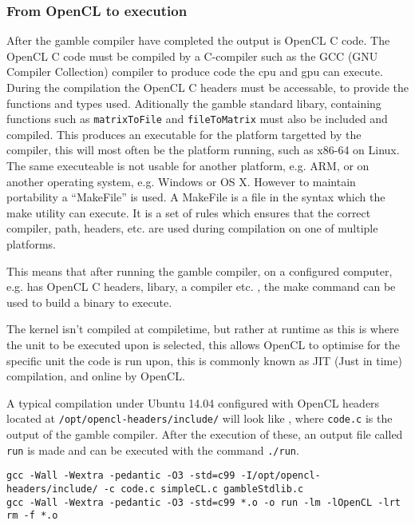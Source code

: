 \subsubsection*{From OpenCL to execution}
After the \gls{gamble} compiler have completed the output is OpenCL C code.
The OpenCL C code must be compiled by a C-compiler such as the GCC (GNU Compiler Collection) compiler to produce code the \acrshort{cpu} and \acrshort{gpu} can execute.
During the compilation the OpenCL C headers must be accessable, to provide the functions and types used. 
Aditionally the \gls{gamble} standard libary, containing functions such as \texttt{matrixToFile} and \texttt{fileToMatrix} must also be included and compiled. 
This produces an executable for the platform targetted by the compiler, this will most often be the platform running, such as x86-64 on Linux.
The same executeable is not usable for another platform, e.g. ARM, or on another operating system, e.g. Windows or OS X. 
However to maintain portability a ``MakeFile'' is used. 
A MakeFile is a file in the syntax which the make utility can execute. 
It is a set of rules which ensures that the correct compiler, path, headers, etc. are used during compilation on one of multiple platforms. 

This means that after running the \gls{gamble} compiler, on a configured computer, e.g. has OpenCL C headers, libary, a compiler etc. , the make command can be used to build a binary to execute.

The kernel isn't compiled at compiletime, but rather at runtime as this is where the unit to be executed upon is selected, this allows OpenCL to optimise for the specific unit the code is run upon, this is commonly known as JIT (Just in time) compilation, and online by OpenCL. \citep{openclbookjit}

A typical compilation under Ubuntu 14.04 configured with OpenCL headers located at \texttt{/opt/opencl-headers/include/} will look like , where \texttt{code.c} is the output of the \gls{gamble} compiler.
After the execution of these, an output file called \texttt{run} is made and can be executed with the command \texttt{./run}. 

\begin{lstlisting}[caption=The commands executed by the make command according to the rules of the MakeFile,numbers=none,frame=tlrb,label={lst:makecommands}]
gcc -Wall -Wextra -pedantic -O3 -std=c99 -I/opt/opencl-headers/include/ -c code.c simpleCL.c gambleStdlib.c
gcc -Wall -Wextra -pedantic -O3 -std=c99 *.o -o run -lm -lOpenCL -lrt
rm -f *.o
\end{lstlisting}